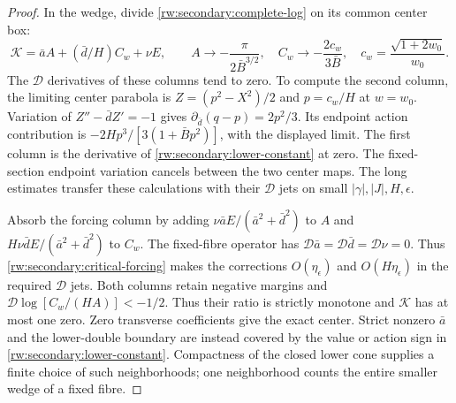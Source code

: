 \begin{proof}
In the wedge, divide \eqref{rw:secondary:complete-log} on its
common center box:
\begin{equation}\label{rw:secondary:wedge-columns}
 \mathcal K=\bar a A+(\bar d/H)C_w+\nu E,\qquad
 A\to-\frac{\pi}{2\bar B^{3/2}},\quad
 C_w\to-\frac{2c_w}{3\bar B},\quad
 c_w=\frac{\sqrt{1+2w_0}}{w_0}.
\end{equation}
The $\mathcal D$ derivatives of these columns tend to zero.
To compute the second column, the limiting center parabola is
$Z=(p^2-X^2)/2$ and $p=c_w/H$ at $w=w_0$.
Variation of $Z''-\bar dZ'=-1$ gives
$\partial_{\bar d}(q-p)=2p^2/3$.
Its endpoint action contribution is
$-2Hp^3/[3(1+\bar Bp^2)]$, with the displayed limit.
The first column is the derivative of
\eqref{rw:secondary:lower-constant} at zero.
The fixed-section endpoint variation cancels between the two
center maps. The long estimates transfer these calculations with
their $\mathcal D$ jets on small $|\gamma|,|J|,H,\epsilon$.

Absorb the forcing column by adding
$\nu\bar a E/(\bar a^2+\bar d^2)$ to $A$ and
$H\nu\bar d E/(\bar a^2+\bar d^2)$ to $C_w$.
The fixed-fibre operator has
$\mathcal D\bar a=\mathcal D\bar d=\mathcal D\nu=0$.
Thus \eqref{rw:secondary:critical-forcing} makes the corrections
$O(\eta_\epsilon)$ and $O(H\eta_\epsilon)$ in the required
$\mathcal D$ jets. Both columns retain negative
margins and
$\mathcal D\log[C_w/(HA)]<-1/2$.
Thus their ratio is strictly monotone and $\mathcal K$ has at most
one zero. Zero transverse coefficients give the exact center.
Strict nonzero $\bar a$ and the lower-double boundary are instead
covered by the value or action sign in
\eqref{rw:secondary:lower-constant}. Compactness of the closed
lower cone supplies a finite choice of such neighborhoods; one
neighborhood counts the entire smaller wedge of a fixed fibre.


\end{proof}
